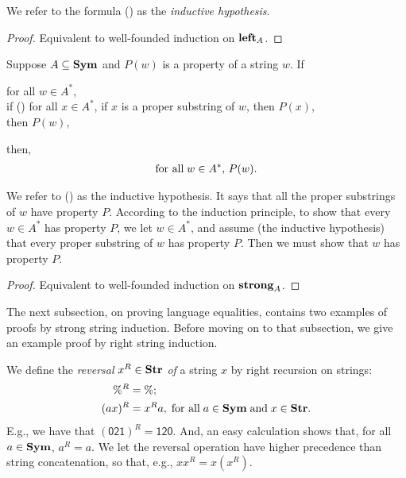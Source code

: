 We refer to the formula (\dag) as the \emph{inductive hypothesis}.

\begin{proof}
Equivalent to well-founded induction on $\mathrel{\mathbf{left}}_A$.
\end{proof}

%
%
\begin{theorem}
Suppose $A\subseteq\mathbf{Sym}$ and $P(w)$ is a property of a string $w$.
If
\begin{ctabbing}
for all $w\in A^*$, \\
if {\rm(\dag)} for all $x\in A^*$, if $x$ is a proper substring
of $w$, then $P(x)$, \\
then $P(w)$,
\end{ctabbing}
then,
\begin{gather*}
\allowbreak\mbox{for all}\allowbreak\;w\in A^*,\,P(w) .
\end{gather*}
\end{theorem}

We refer to (\dag) as the inductive hypothesis.  It says that all the
proper substrings of $w$ have property $P$.  According to the
induction principle, to show that every $w\in A^*$ has property $P$,
we let $w\in A^*$, and assume (the inductive hypothesis) that every
proper substring of $w$ has property $P$.  Then we must show that $w$
has property $P$.

\begin{proof}
Equivalent to well-founded induction on $\mathrel{\mathbf{strong}}_A$.
\end{proof}

The next subsection, on proving language equalities, contains two
examples of proofs by strong string induction.  Before moving on to
that subsection, we give an example proof by right string induction.

We define the
\emph{reversal}
%
%
$x^R\in\mathbf{Str}$
%
%
\emph{of} a string $x$ by right recursion
%
on strings:
\begin{align*}
\%^R &= \% ; \\
(ax)^R &= x^Ra, \;\allowbreak\mbox{for all}\allowbreak\; a\in\mathbf{Sym} \;\allowbreak\mbox{and}\allowbreak\; x\in\mathbf{Str} .
\end{align*}
E.g., we have that $\mathsf{(021)}^R=\mathsf{120}$.  And, an easy
calculation shows that, for all $a\in\mathbf{Sym}$, $a^R=a$.  We let the
reversal operation have higher precedence than string concatenation,
so that, e.g., $xx^R = x(x^R)$.

